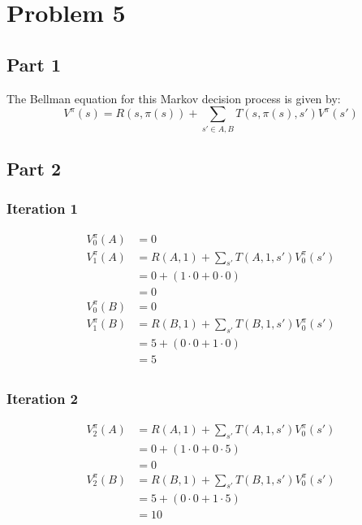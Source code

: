 \documentclass[12pt]{article}
\begin{document}
\section{Problem 5}

\subsection{Part 1}

The Bellman equation for this Markov decision process is given by:
$$V^\pi (s) = R(s, \pi (s)) + \sum_{s' \in {A, B}} T(s, \pi (s), s') V^\pi (s')$$

\subsection{Part 2}

\subsubsection{Iteration 1}

\begin{align*}
    V_0^\pi (A) &= 0 \\
    V_1^\pi (A) &= R(A, 1) + \sum_{s'} T(A, 1, s') V_0^\pi (s') \\
    &= 0 + (1 \cdot 0 + 0 \cdot 0) \\
    &= 0 \\
    V_0^\pi (B) &= 0 \\
    V_1^\pi (B) &= R(B, 1) + \sum_{s'} T(B, 1, s') V_0^\pi (s') \\
    &= 5 + (0 \cdot 0 + 1 \cdot 0) \\
    &= 5 \\
\end{align*}

\subsubsection{Iteration 2}

\begin{align*}
    V_2^\pi (A) &= R(A, 1) + \sum_{s'} T(A, 1, s') V_0^\pi (s') \\
    &= 0 + (1 \cdot 0 + 0 \cdot 5) \\
    &= 0 \\
    V_2^\pi (B) &= R(B, 1) + \sum_{s'} T(B, 1, s') V_0^\pi (s') \\
    &= 5 + (0 \cdot 0 + 1 \cdot 5) \\
    &= 10 \\
\end{align*}
\end{document}

